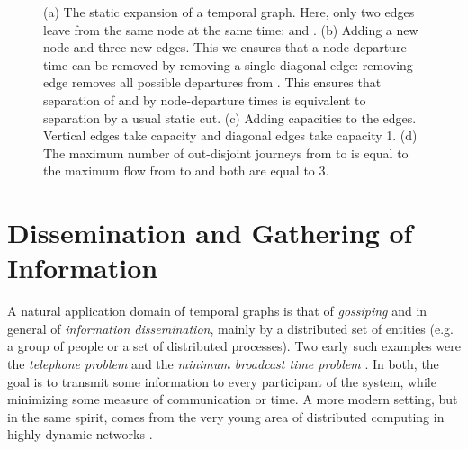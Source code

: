 \documentclass[oribibl, 11pt]{llncs}
\begin{document}
\begin{figure}[!hbtp]
   \caption{(a) The static expansion of a temporal graph. Here, only two edges leave from the same node at the same time:  and . (b) Adding a new node  and three new edges. This we ensures that a node departure time can be removed by removing a single diagonal edge: removing edge  removes all possible departures from . This ensures that separation of  and  by node-departure times is equivalent to separation by a usual static cut. (c) Adding capacities to the edges. Vertical edges take capacity  and diagonal edges take capacity 1. (d) The maximum number of out-disjoint journeys from  to  is equal to the maximum flow from  to  and both are equal to 3.} \label{fig:menger-example-expansion}
\end{figure}

\section{Dissemination and Gathering of Information}
\label{sec:dissemination}

A natural application domain of temporal graphs is that of \emph{gossiping} and in general of \emph{information dissemination}, mainly by a distributed set of entities (e.g. a group of people or a set of distributed processes). Two early such examples were the \emph{telephone problem} \cite{BS72} and the \emph{minimum broadcast time problem} \cite{Ra94}. In both, the goal is to transmit some information to every participant of the system, while minimizing some measure of communication or time. A more modern setting, but in the same spirit, comes from the very young area of distributed computing in highly dynamic networks \cite{OW05,KLO10,KO11,CFQS12,MCS14,MCS13b}. 
\end{document}
